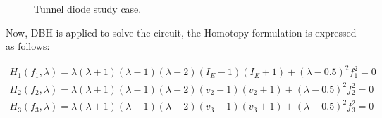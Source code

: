\documentclass[conference,letterpaper,onecolumn]{IEEEtran}
\begin{document}
{\begin{figure}[hbtp]
\begin{center}
\hspace{0.5in}
\end{center}
\caption{Tunnel diode study case.}
\label{fig:subfig1}
\end{figure}

Now, DBH is applied to solve the circuit, the Homotopy formulation is expressed as follows:

\begin{displaymath}
\begin{array}{c}
H_1(f_1,\lambda)=\lambda(\lambda+1)(\lambda-1)(\lambda-2)(I_E-1)(I_E+1)+(\lambda-0.5)^2 f_1^2=0\\
H_2(f_2,\lambda)=\lambda(\lambda+1)(\lambda-1)(\lambda-2)(v_2-1)(v_2+1)+(\lambda-0.5)^2 f_2^2=0\\
H_3(f_3,\lambda)=\lambda(\lambda+1)(\lambda-1)(\lambda-2)(v_3-1)(v_3+1)+(\lambda-0.5)^2 f_3^2=0\\
\end{array}
\end{displaymath}

}
\end{document}
